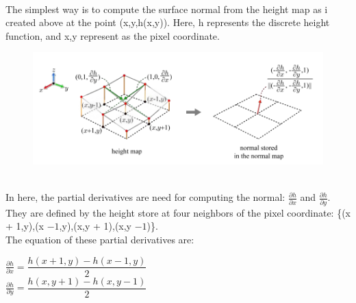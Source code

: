 \documentclass[a4paper, 13pt]{extarticle}
\begin{document}
 \\[0.01cm]
 The simplest way is to compute the surface normal from the height map as i created above at the point  (x,y,h(x,y)). Here, h represents the discrete height function, and x,y represent as the pixel coordinate. 
 \begin{figure}[h]
 	\begin{minipage}{1\textwidth}
 		\centering
 		\includegraphics[width=0.8\linewidth]{intructions/normal_map_calculation.png}
 		\centering
 	\end{minipage}
 \end{figure} 
\\[0.01cm]
In here, the partial derivatives are need for computing the normal: $\frac{\partial h}{\partial x}$ and $\frac{\partial h}{\partial y}$. They are defined by the height store at four neighbors of the pixel coordinate: \{(x + 1,y),(x $- 1$,y),(x,y + 1),(x,y $- 1$)\}. \\[0.01cm]The equation of these partial derivatives are: \begin{minipage}{1\textwidth}
	\scalebox{1.3} {$\frac{\partial h}{\partial x} = \dfrac{h(x + 1,y) - h(x - 1,y)}{2}$ }
	\\[0.04cm]
	\scalebox{1.3} {$\frac{\partial h}{\partial y} = \dfrac{h(x,y + 1) - h(x,y - 1)}{2}$ }
\end{minipage}
\end{document}
